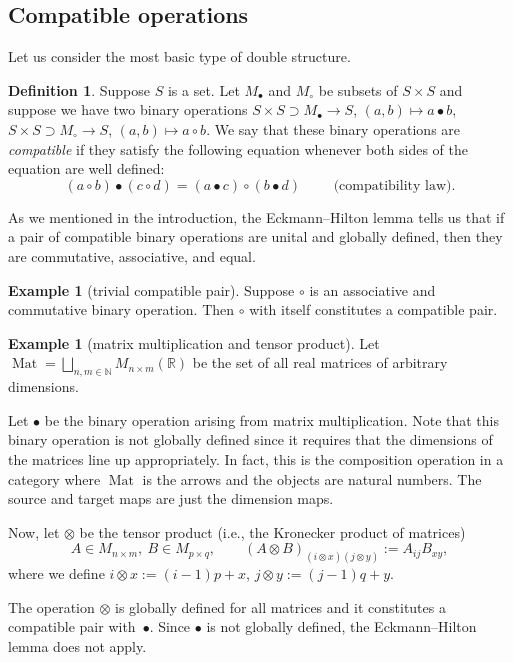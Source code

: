 \documentclass[10pt,a4paper]{amsart}
\numberwithin{equation}{section}
\theoremstyle{definition}
\newtheorem{Definition}[Theorem]{Definition}
\newtheorem{Example}[Theorem]{Example}
\newcommand{\BBR}{\mathbb{R}}
\newcommand{\BBN}{\mathbb{N}}
\DeclareMathOperator{\Mat}{Mat}
\begin{document}
\subsection{Compatible operations}
Let us consider the most basic type of double structure.
\begin{Definition}
  Suppose $ S $ is a set. Let $ M_\bullet $ and $ M_\circ $ be subsets of $ S \times S $ and suppose we have two binary operations
$S \times S \supset M_{\bullet} \to S$, $(a,b) \mapsto a \bullet b$, $S \times S \supset M_{\circ} \to S$, $(a,b) \mapsto a \circ b$. We say that these binary operations are \emph{compatible} if they satisfy the following equation whenever both sides of the equation are well defined:
  \begin{equation*}\label{eqn:The.Intertwining.Law}
  ( a \circ b) \bullet ( c \circ d) = (a \bullet c) \circ (b \bullet d) \qquad \text{ (compatibility law)}.
\end{equation*}
\end{Definition}
As we mentioned in the introduction, the Eckmann--Hilton lemma tells us that if a pair of compatible binary operations are unital and globally defined, then they are commutative, associative, and equal.

\begin{Example}[trivial compatible pair]
  Suppose $ \circ $ is an associative and commutative binary operation. Then $ \circ $ with itself constitutes a compatible pair.
\end{Example}
\begin{Example}[matrix multiplication and tensor product]\label{example:mat.mult.tensor}
  Let
$ \Mat = \bigsqcup_{n,m \in \BBN } M_{n \times m}(\BBR)$
  be the set of all real matrices of arbitrary dimensions.

   Let $ \bullet $ be the binary operation arising from matrix multiplication. Note that this binary operation is not globally defined since it requires that the dimensions of the matrices line up appropriately. In fact, this is the composition operation in a category where $ \Mat $ is the arrows and the objects are natural numbers. The source and target maps are just the dimension maps.

  Now, let $ \otimes $ be the tensor product (i.e., the Kronecker product of matrices)
  \[
  A \in M_{n\times m}, \  B \in M_{p \times q}, \qquad (A \otimes B )_{(i \otimes x)( j \otimes y)} := A_{ij} B_{xy},
  \]
  where we define
  $i \otimes x := (i-1)p + x$, $ j \otimes y := (j-1)q + y$.

   The operation $ \otimes $ is globally defined for all matrices and it constitutes a compatible pair with~$ \bullet $. Since $ \bullet$ is not globally defined, the Eckmann--Hilton lemma does not apply.
\end{Example}
\end{document}
